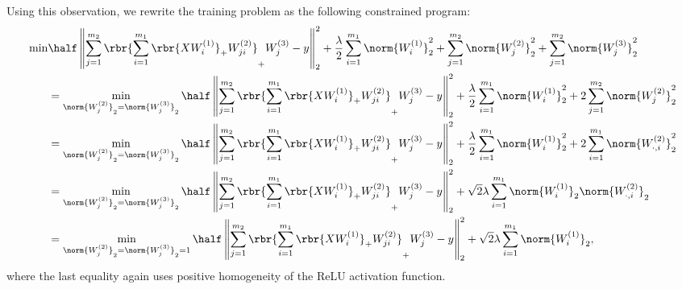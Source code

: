 \documentclass{article}
\newcommand{\wone}{W^{(1)}}
\newcommand{\wtwo}{W^{(2)}}
\newcommand{\wthree}{W^{(3)}}
\begin{document}
Using this observation, we rewrite the training problem as the following
constrained program:
\begin{align*}
    \min
     & \half \left\|
    \sum_{j = 1}^{m_2} \rbr{\sum_{i = 1}^{m_1} \rbr{X \wone_i}_+ \wtwo_{ji}}_+ \wthree_j
    - y
    \right\|_2^2
    + \frac{\lambda}{2}
    \sum_{i=1}^{m_1} \norm{\wone_i}_2^2
    + \sum_{j=1}^{m_2} \norm{\wtwo_j}_2^2
    + \sum_{j=1}^{m_2} \norm{\wthree_j}_2^2                     \\
     & =
    \min_{\norm{\wtwo_j}_2 = \norm{\wthree_j}_2}
    \half \left\|
    \sum_{j = 1}^{m_2} \rbr{\sum_{i = 1}^{m_1} \rbr{X \wone_i}_+ \wtwo_{ji}}_+ \wthree_j
    - y
    \right\|_2^2
    + \frac{\lambda}{2}
    \sum_{i=1}^{m_1} \norm{\wone_i}_2^2
    + 2\sum_{j=1}^{m_2} \norm{\wtwo_j}_2^2                      \\
     & =
    \min_{\norm{\wtwo_j}_2 = \norm{\wthree_j}_2}
    \half \left\|
    \sum_{j = 1}^{m_2} \rbr{\sum_{i = 1}^{m_1} \rbr{X \wone_i}_+ \wtwo_{ji}}_+ \wthree_j
    - y
    \right\|_2^2
    + \frac{\lambda}{2}
    \sum_{i=1}^{m_1} \norm{\wone_i}_2^2
    + 2\sum_{i=1}^{m_1} \norm{\wtwo_{\cdot, i}}_2^2             \\
     & =
    \min_{\norm{\wtwo_j}_2 = \norm{\wthree_j}_2}
    \half \left\|
    \sum_{j = 1}^{m_2} \rbr{\sum_{i = 1}^{m_1} \rbr{X \wone_i}_+ \wtwo_{ji}}_+ \wthree_j
    - y
    \right\|_2^2
    + \sqrt{2}\lambda
    \sum_{i=1}^{m_1} \norm{\wone_i}_2 \norm{\wtwo_{\cdot, i}}_2 \\
     & =
    \min_{\norm{\wtwo_j}_2 = \norm{\wthree_j}_2 = 1}
    \half \left\|
    \sum_{j = 1}^{m_2} \rbr{\sum_{i = 1}^{m_1} \rbr{X \wone_i}_+ \wtwo_{ji}}_+ \wthree_j
    - y
    \right\|_2^2
    + \sqrt{2}\lambda
    \sum_{i=1}^{m_1} \norm{\wone_i}_2,
\end{align*}
where the last equality again uses positive homogeneity of the ReLU activation
function.
\end{document}
